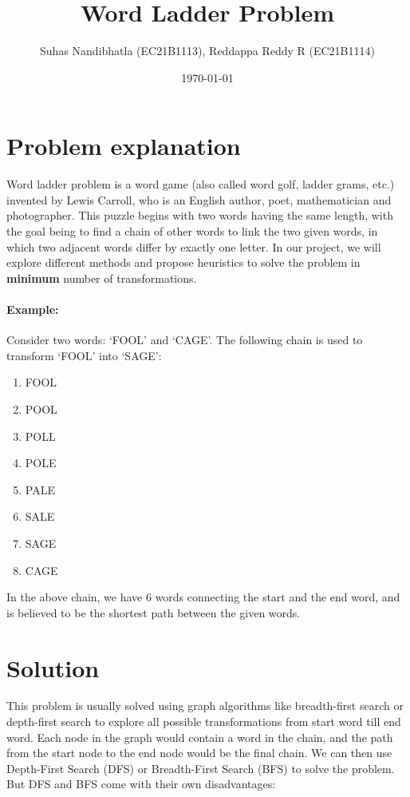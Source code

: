 \documentclass{article}
\title{
    \textbf{Word Ladder Problem}
}
\author{
    Suhas Nandibhatla (EC21B1113), Reddappa Reddy R (EC21B1114)
}
\date{\today}
\begin{document}
\maketitle

\section*{Problem explanation}

Word ladder problem is a word game (also called word golf, ladder grams, etc.) invented by Lewis Carroll, who is an English author, poet, mathematician and photographer. This puzzle begins with two words having the same length, with the goal being to find a chain of other words to link the two given words, in which two adjacent words differ by exactly one letter. In our project, we will explore different methods and propose heuristics to solve the problem in \textbf{minimum} number of transformations.

\paragraph*{Example:} Consider two words: `FOOL' and `CAGE'. The following chain is used to transform `FOOL' into `SAGE':

\begin{enumerate}
    \item FOOL
    \item POOL
    \item POLL
    \item POLE
    \item PALE
    \item SALE
    \item SAGE
    \item CAGE
\end{enumerate}

In the above chain, we have 6 words connecting the start and the end word, and is believed to be the shortest path between the given words.

\section*{Solution}

This problem is usually solved using graph algorithms like breadth-first search or depth-first search to explore all possible transformations from start word till end word. Each node in the graph would contain a word in the chain, and the path from the start node to the end node would be the final chain.
We can then use Depth-First Search (DFS) or Breadth-First Search (BFS) to solve the problem. But DFS and BFS come with their own disadvantages:
\end{document}

